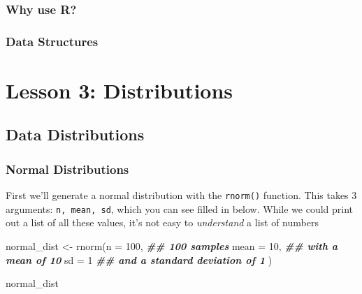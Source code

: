 \documentclass[
]{book}
\newenvironment{Shaded}{\begin{snugshade}}{\end{snugshade}}
\newcommand{\AttributeTok}[1]{\textcolor[rgb]{0.77,0.63,0.00}{#1}}
\newcommand{\DecValTok}[1]{\textcolor[rgb]{0.00,0.00,0.81}{#1}}
\newcommand{\DocumentationTok}[1]{\textcolor[rgb]{0.56,0.35,0.01}{\textbf{\textit{#1}}}}
\newcommand{\FunctionTok}[1]{\textcolor[rgb]{0.00,0.00,0.00}{#1}}
\newcommand{\NormalTok}[1]{#1}
\newcommand{\OtherTok}[1]{\textcolor[rgb]{0.56,0.35,0.01}{#1}}
\begin{document}
\hypertarget{why-use-r}{%
\subsection{Why use R?}\label{why-use-r}}

\hypertarget{data-structures}{%
\subsection{Data Structures}\label{data-structures}}

\hypertarget{lesson-3-distributions}{%
\chapter{Lesson 3: Distributions}\label{lesson-3-distributions}}

\hypertarget{data-distributions}{%
\section{Data Distributions}\label{data-distributions}}

\hypertarget{normal-distributions}{%
\subsection{Normal Distributions}\label{normal-distributions}}

First we'll generate a normal distribution with the \texttt{rnorm()} function. This takes 3 arguments: \texttt{n,\ mean,\ sd}, which you can see filled in below. While we could print out a list of all these values, it's not easy to \emph{understand} a list of numbers

\begin{Shaded}
\begin{Highlighting}[]
\NormalTok{normal\_dist }\OtherTok{\textless{}{-}} \FunctionTok{rnorm}\NormalTok{(}\AttributeTok{n =} \DecValTok{100}\NormalTok{, }\DocumentationTok{\#\# 100 samples}
                     \AttributeTok{mean =} \DecValTok{10}\NormalTok{, }\DocumentationTok{\#\# with a mean of 10}
                     \AttributeTok{sd =} \DecValTok{1} \DocumentationTok{\#\# and a standard deviation of 1}
\NormalTok{                     )}


\NormalTok{normal\_dist}
\end{Highlighting}
\end{Shaded}
\end{document}
